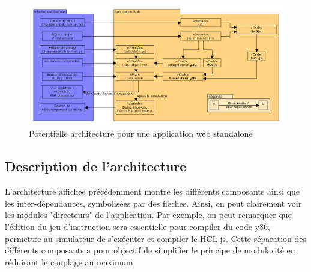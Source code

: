\documentclass[french]{article}
\begin{document}
\begin{appendix}

\begin{figure}[H]
    \centering
    \includegraphics[width=\paperwidth, angle=270]{img/architecture_modulaire_standalone.png}
    \caption{Potentielle architecture pour une application web standalone}
    \label{fig:diag_archi_modulaire_standalone}
\end{figure}

\subsection{Description de l'architecture}

L'architecture affichée précédemment montre les différents composants ainsi que les inter-dépendances, symbolisées par des flèches. Ainsi, on peut clairement voir les modules "directeurs" de l'application. Par exemple, on peut remarquer que l'édition du jeu d'instruction sera essentielle pour compiler du code y86, permettre au simulateur de s'exécuter et compiler le HCL.js. Cette séparation des différents composants a pour objectif de simplifier le principe de modularité en réduisant le couplage au maximum.

\end{appendix}
\end{document}
